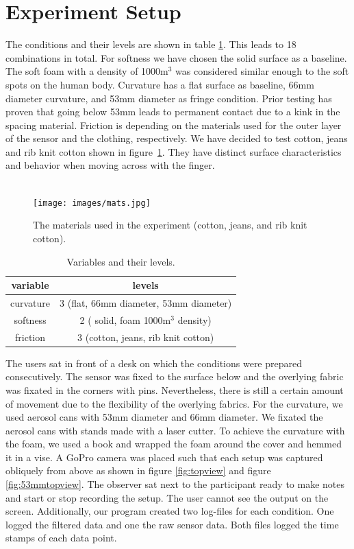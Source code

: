 \section{Experiment Setup}
The conditions and their levels are shown in table \ref{table:conditions}. This leads to 18 combinations in total. For softness we have chosen the solid surface as a baseline. The soft foam with a density of 1000m$^3$ was considered similar enough to the soft spots on the human body. Curvature has a flat surface as baseline, 66mm diameter curvature, and 53mm diameter as fringe condition. Prior testing has proven that going below 53mm leads to permanent contact due to a kink in the spacing material. Friction is depending on the materials used for the outer layer of the sensor and the clothing, respectively. We have decided to test cotton, jeans and rib knit cotton shown in figure~\ref{fig:mats}. They have distinct surface characteristics and behavior when moving across with the finger. \\ \\\begin{figure}
\texttt{[image: images/mats.jpg]}
\caption{The materials used in the experiment (cotton, jeans, and rib knit cotton).}
\label{fig:mats}
\end{figure}\begin{table}
\begin{tabular}{|c|c|}
  \hline
  \textbf{variable}& \textbf{levels} \\
  \hline
  curvature & 3 (flat, 66mm diameter, 53mm diameter) \\
  \hline
  softness &2 ( solid, foam 1000m$^3$ density) \\
  \hline
  friction & 3 (cotton, jeans, rib knit cotton) \\
  \hline
\end{tabular}
\caption{Variables and their levels.}
\label{table:conditions}
\end{table}The users sat in front of a desk on which the conditions were prepared consecutively. The sensor was fixed to the surface below and the overlying fabric was fixated in the corners with pins. Nevertheless, there is still a certain amount of movement due to the flexibility of the overlying fabrics. For the curvature, we used aerosol cans with 53mm diameter and 66mm diameter. We fixated the aerosol cans with stands made with a laser cutter. To achieve the curvature with the foam, we used a book and wrapped the foam around the cover and hemmed it in a vise. A GoPro camera was placed such that each setup was captured obliquely from above as shown in figure \ref{fig:topview} and figure \ref{fig:53mmtopview}. The observer sat next to the participant ready to make notes and start or stop recording the setup. The user cannot see the output on the screen. Additionally, our program created two log-files for each condition. One logged the filtered data and one the raw sensor data. Both files logged the time stamps of each data point.\\ \\\begin{figure}

\end{figure}
